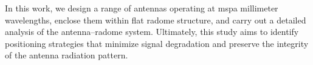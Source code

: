 \documentclass[11pt,a4paper]{report}
\begin{document}
In this work, we design a range of antennas operating at mspa millimeter wavelengths, enclose them within flat radome structure, and carry out a detailed analysis of the antenna–radome system. Ultimately, this study aims to identify positioning strategies that minimize signal degradation and preserve the integrity of the antenna radiation pattern.

\tableofcontents
\listoffigures
\listoftables

\cleardoublepage
\thispagestyle{empty}
\null
\newpage










\nocite{*}


\end{document}
